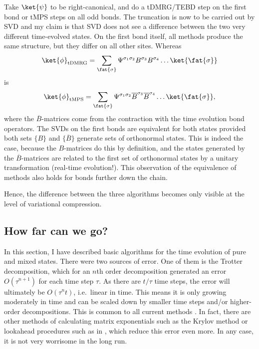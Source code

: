 Take $\ket{\psi}$ to be right-canonical, and do a tDMRG/TEBD step on the first bond or tMPS steps on all odd bonds. The truncation is now to be carried out by SVD and my claim is that SVD does not see a difference between the two very different time-evolved states. On the first bond itself, all methods produce the same structure, but they differ on all other sites. Whereas
\begin{equation}
\ket{\phi}_{{\rm tDMRG}} = \sum_{\fat{\sigma}} \Psi^{\sigma_1\sigma_2} B^{\sigma_3} B^{\sigma_4} \ldots \ket{\fat{\sigma}}  
\end{equation}
is 
\begin{equation}
\ket{\phi}_{{\rm tMPS}} = \sum_{\fat{\sigma}} \Psi^{\sigma_1\sigma_2} \overline{B}^{\sigma_3} \overline{B}^{\sigma_4} \ldots \ket{\fat{\sigma}}  ,
\end{equation}
where the $\overline{B}$-matrices come from the contraction with the time evolution bond operators. The SVDs on the first bonds are equivalent for both states provided both sets $\{ B \}$ and $\{ \overline{B} \}$ generate sets of orthonormal states. This is indeed the case, because the $B$-matrices do this by definition, and the states generated by the $\overline{B}$-matrices are related to the first set of orthonormal states by a unitary transformation (real-time evolution!). This observation of the equivalence of methods also holds for bonds further down the chain.

Hence, the difference between the three algorithms becomes only visible at the level of variational compression.
 
\subsection{How far can we go?} 
In this section, I have described basic algorithms for the time evolution of pure and mixed states. There were two sources of error. One of them is the Trotter decomposition, which for an $n$th order decomposition generated an error $O(\tau^{n+1})$ for each time step $\tau$. As there are $t/\tau$ time steps, the error will ultimately be $O(\tau^n t)$, i.e.\ linear in time. This means it is only growing moderately in time and can be scaled down by smaller time steps and/or higher-order decompositions. This is common to all current methods \cite{Vidal03a,Vidal04b,Daley04,WhiteFeiguin04,VerstraeteRipoll04}.  In fact, there are other methods of calculating matrix exponentials such as the Krylov method\cite{Schmitteckert04} or lookahead procedures such as in \cite{Feiguin05}, which reduce this error even more. In any case, it is not very worrisome in the long run. 

